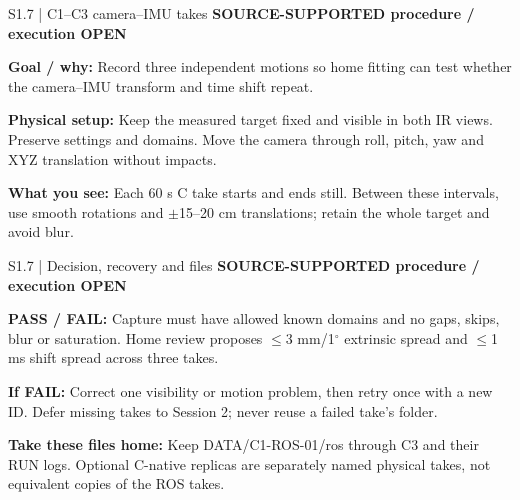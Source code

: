 \documentclass[aspectratio=169,12pt,t]{beamer}
\newcommand{\evidence}[1]{{\small\bfseries\color{teal!70!black}#1}\par\medskip}
\begin{document}
\begin{frame}{S1.7 | C1–C3 camera–IMU takes}
\evidence{SOURCE-SUPPORTED procedure / execution OPEN}
\textbf{Goal / why:} Record three independent motions so home fitting can test whether the camera–IMU transform and time shift repeat.\par\medskip\textbf{Physical setup:} Keep the measured target fixed and visible in both IR views. Preserve settings and domains. Move the camera through roll, pitch, yaw and XYZ translation without impacts.\par\medskip\textbf{What you see:} Each 60 s C take starts and ends still. Between these intervals, use smooth rotations and $\pm$15–20 cm translations; retain the whole target and avoid blur.
\end{frame}
\begin{frame}{S1.7 | Decision, recovery and files}
\evidence{SOURCE-SUPPORTED procedure / execution OPEN}
\textbf{PASS / FAIL:} Capture must have allowed known domains and no gaps, skips, blur or saturation. Home review proposes $\leq$3 mm/1$^\circ$ extrinsic spread and $\leq$1 ms shift spread across three takes.\par\medskip\textbf{If FAIL:} Correct one visibility or motion problem, then retry once with a new ID. Defer missing takes to Session 2; never reuse a failed take’s folder.\par\medskip\textbf{Take these files home:} Keep DATA/C1-ROS-01/ros through C3 and their RUN logs. Optional C-native replicas are separately named physical takes, not equivalent copies of the ROS takes.
\end{frame}
\end{document}
